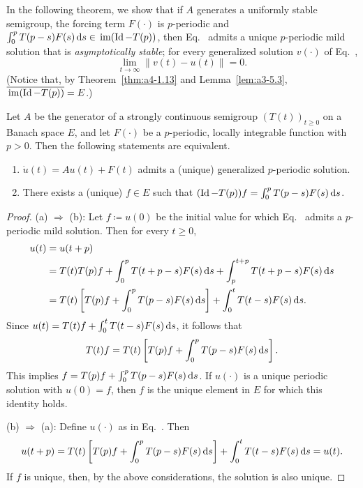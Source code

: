 In the following theorem, we show that if $A$ generates a
uniformly stable semigroup, the forcing term $F(\cdot)$ is $p$-periodic
and $\int_{0}^{p} T(p-s)F(s)  \mathop{}\!\mathrm{d}{s} \in \mathop{}\mathrm{im}(\operatorname{Id} - T(p))$, then Eq.~
 admits a unique $p$-periodic mild solution that is \emph{asymptotically stable}; 
 \ie for every generalized solution $v(\cdot)$ of Eq.~, 
\[
\lim_{t \to \infty} \|v(t) - u(t)\| = 0.
\]  
(Notice that, by
Theorem~\ref{thm:a4-1.13} and Lemma~\ref{lem:a3-5.3}, $\overline{ \mathop{}\mathrm{im}( \operatorname{Id} - T(p) ) } = E $.)
\begin{lemma}\label{lem:a4-2.2}
Let $A$ be the generator of a strongly continuous semigroup $(T(t))_{t \geq 0}$ on a Banach space $E$, and let $F(\cdot)$ be a $p$-periodic, locally integrable function with $p > 0$. 
Then the following statements are equivalent.
\begin{enumerate}[\upshape (a)]
\item 
$\dot{u}(t) = Au(t) + F(t)$ admits a (unique) generalized $p$-periodic solution.

\item 
There exists a (unique) $f \in E$ such that $(\operatorname{Id} - T(p))f = \int_{0}^{p} T(p-s)F(s)  \mathop{}\!\mathrm{d}{s}$.
\end{enumerate}
\end{lemma}
\begin{proof}
(a) $\Rightarrow$ (b): 
Let $f \coloneq u(0)$ be the initial value for which Eq.~ admits a $p$-periodic mild solution. 
Then for every $t \geq 0$,
\begin{align*}
u(t) &= u(t+p) \\
&= T(t)T(p)f + \int_{0}^{p} T(t+p-s)F(s)  \mathop{}\!\mathrm{d}{s} + \int_{p}^{t+p} T(t+p-s)F(s)  \mathop{}\!\mathrm{d}{s} \\
&= T(t)\left[T(p)f + \int_{0}^{p} T(p-s)F(s)  \mathop{}\!\mathrm{d}{s}\right] + \int_{0}^{t} T(t-s)F(s)  \mathop{}\!\mathrm{d}{s}.
\end{align*}
Since $u(t) = T(t)f+\int_0^t T(t-s)F(s)\mathop{}\!\mathrm{d}{s}$, it follows that
\[T(t)f = T(t)\left[T(p)f+\int_0^pT(p-s)F(s)\mathop{}\!\mathrm{d}{s}\right].\]
This implies $f = T(p)f + \int_{0}^{p} T(p-s)F(s)  \mathop{}\!\mathrm{d}{s}$.
If\/ $u(\cdot)$ is a unique periodic solution with $u(0) = f$, then $f$ is the unique element in $E$ for which this identity holds.

(b) $\Rightarrow$ (a):  
Define $u(\cdot)$ as in Eq.~. 
Then
\begin{align*}
u(t+p) = T(t)\left[T(p)f + \int_{0}^{p} T(p-s)F(s)  \mathop{}\!\mathrm{d}{s}\right] + \int_{0}^{t} T(t-s)F(s)  \mathop{}\!\mathrm{d}{s} = u(t).
\end{align*}
If\/ $f$ is unique, then, by the above considerations, the solution is also unique.
\end{proof}
